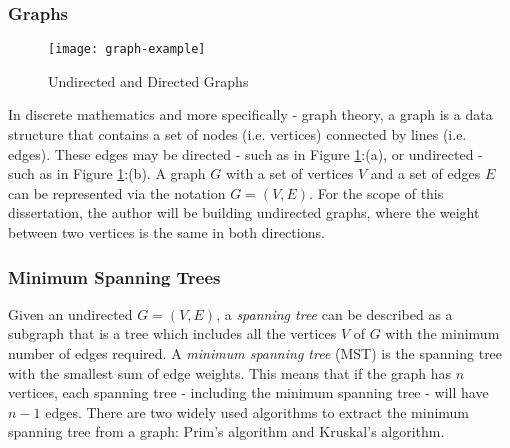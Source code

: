 \documentclass[a4paper,11pt]{article}
\begin{document}
\subsubsection*{Graphs}
\begin{figure}[H]
\centering
\texttt{[image: graph-example]}
\caption{Undirected and Directed Graphs}
\label{fig:graph.example}
\end{figure}
In discrete mathematics and more specifically - graph theory, a graph is a data structure that contains a set of nodes (i.e. vertices) connected by lines (i.e. edges).  These edges may be directed - such as in Figure \ref{fig:graph.example}:(a), or undirected - such as in Figure \ref{fig:graph.example}:(b). A graph $G$ with a set of vertices $V$ and a set of edges $E$ can be represented via the notation $G = (V,E)$. For the scope of this dissertation,  the author will be building undirected graphs, where the weight between two vertices is the same in both directions.
\subsubsection{Minimum Spanning Trees}
Given an undirected $G = (V,E)$,  a \textit{spanning tree} can be described as a subgraph that is a tree which includes all the vertices $V$ of $G$ with the minimum number of edges required. A \textit{minimum spanning tree} (MST) is the spanning tree with the smallest sum of edge weights.  This means that if the graph has $n$ vertices, each spanning tree - including the minimum spanning tree - will have $n-1$ edges. There are two widely used algorithms to extract the minimum spanning tree from a graph: Prim's algorithm and Kruskal's algorithm.
\end{document}
